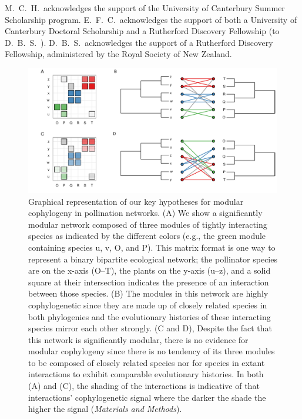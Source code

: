 \documentclass{article}
\begin{document}
 M.\ C.\ H.\ acknowledges the support of the University of Canterbury Summer Scholarship program. E.\ F.\ C.\ acknowledges the support of both a University of Canterbury Doctoral Scholarship and a Rutherford Discovery Fellowship (to D.\ B.\ S.\ ). D.\ B.\ S.\ acknowledges the support of a Rutherford Discovery Fellowship, administered by the Royal Society of New Zealand.\\

\clearpage


\begin{figure}[ht]
\centerline{\includegraphics*[width=1.00\textwidth]{fig_hypotheses}}
\caption{Graphical representation of our key hypotheses for modular cophylogeny in pollination networks. (A) We show a significantly modular network composed of three modules of tightly interacting species as indicated by the different colors (e.g., the green module containing species u, v, O, and P). This matrix format is one way to represent a binary bipartite ecological network; the pollinator species are on the x-axis (O--T), the plants on the y-axis (u--z), and a solid square at their intersection indicates the presence of an interaction between those species. (B) The modules in this network are highly cophylogenetic since they are made up of closely related species in both phylogenies and the evolutionary histories of these interacting species mirror each other strongly. (C and D), Despite the fact that this network is significantly modular, there is no evidence for modular cophylogeny since there is no tendency of its three modules to be composed of closely related species nor for species in extant interactions to exhibit comparable evolutionary histories. In both (A) and (C), the shading of the interactions is indicative of that interactions' cophylogenetic signal where the darker the shade the higher the signal (\emph{Materials and Methods}).}
\label{fig:hypotheses}
\end{figure}
\clearpage
\end{document}
